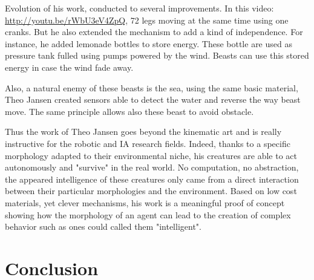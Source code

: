 \begin{figure}[]
\centering
    \hfil
    \hfil
    \caption{}
    \label{fig:beast_mechanism}
\end{figure}



Evolution of his work, conducted to several improvements. In this video: \url{http://youtu.be/rWbU3eV4ZpQ}, 72 legs moving at the same time using one cranks. But he also extended the mechanism to add a kind of independence. For instance, he added lemonade bottles to store energy. These bottle are used as pressure tank fulled using pumps powered by the wind. Beasts can use this stored energy in case the wind fade away.

Also, a natural enemy of these beasts is the sea, using the same basic material, Theo Jansen created sensors able to detect the water and reverse the way beast move. The same principle allows also these beast to avoid obstacle.

Thus the work of Theo Jansen goes beyond the kinematic art and is really instructive for the robotic and IA research fields. Indeed, thanks to a specific morphology adapted to their environmental niche, his creatures are able to act autonomously and "survive" in the real world. No computation, no abstraction, the appeared intelligence of these creatures only came from a direct interaction between their particular morphologies and the environment. Based on low cost materials, yet clever mechanisms, his work is a meaningful proof of concept showing how the morphology of an agent can lead to the creation of complex behavior such as ones could called them "intelligent".

\section{Conclusion} %

